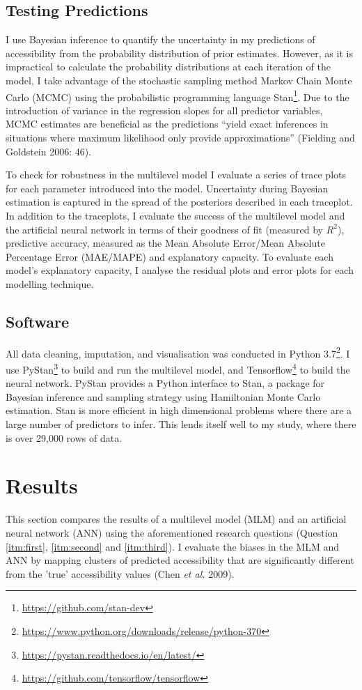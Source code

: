 \documentclass[a4paper,UKenglish]{lipics-v2018}
\begin{document}
\subsection{Testing Predictions}
I use Bayesian inference to quantify the uncertainty in my predictions of accessibility from the probability distribution of prior estimates. However, as it is impractical to calculate the probability distributions at each iteration of the model, I take advantage of the stochastic sampling method Markov Chain Monte Carlo (MCMC) using the probabilistic programming language Stan\footnote{\url{https://github.com/stan-dev}}. Due to the introduction of variance in the regression slopes for all predictor variables, MCMC estimates are beneficial as the predictions “yield exact inferences in situations where maximum likelihood only provide approximations” (Fielding and Goldstein 2006: 46). 

To check for robustness in the multilevel model I evaluate a series of trace plots for each parameter introduced into the model. Uncertainty during Bayesian estimation is captured in the spread of the posteriors described in each traceplot. In addition to the traceplots, I evaluate the success of the multilevel model and the artificial neural network in terms of their goodness of fit (measured by $R^2$), predictive accuracy, measured as the Mean Absolute Error/Mean Absolute Percentage Error (MAE/MAPE) and explanatory capacity. To evaluate each model’s explanatory capacity, I analyse the residual plots and error plots for each modelling technique. 

\subsection{Software}
All data cleaning, imputation, and visualisation was conducted in Python 3.7\footnote{\url{https://www.python.org/downloads/release/python-370}}. I use PyStan\footnote{\url{https://pystan.readthedocs.io/en/latest/}} to build and run the multilevel model, and Tensorflow\footnote{\url{https://github.com/tensorflow/tensorflow}} to build the neural network. PyStan provides a Python interface to Stan, a package for Bayesian inference and sampling strategy using Hamiltonian Monte Carlo estimation. Stan is more efficient in high dimensional problems where there are a large number of predictors to infer. This lends itself well to my study, where there is over 29,000 rows of data. 

\pagebreak
\section{Results}
This section compares the results of a multilevel model (MLM) and an artificial neural network (ANN) using the aforementioned research questions (Question \ref{itm:first}, \ref{itm:second} and \ref{itm:third}). I evaluate the biases in the MLM and ANN by mapping clusters of predicted accessibility that are significantly different from the 'true' accessibility values (Chen \textit{et al.} 2009).
\end{document}
